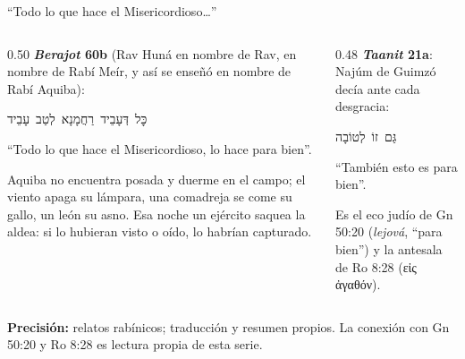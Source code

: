 \documentclass[hyperref={bookmarks=false},aspectratio=169]{beamer}
\newcommand{\heb}[1]{\mbox{\foreignlanguage{hebrew}{#1}}}
\newcommand{\grc}[1]{\foreignlanguage{ancientgreek}{#1}}
\newcommand{\precision}[1]{{\footnotesize\color{gris}\textbf{Precisión:} #1}}
\begin{document}
\begin{frame}{``Todo lo que hace el Misericordioso\ldots''}
\begin{columns}[t,onlytextwidth]
\begin{column}{0.50\textwidth}\small
\textbf{\emph{Berajot} 60b} (Rav Huná en nombre de Rav, en nombre de Rabí Meír, y así se enseñó en nombre de Rabí Aquiba):
\begin{center}\heb{כׇּל דְּעָבֵיד רַחֲמָנָא לְטַב עָבֵיד}\end{center}
``Todo lo que hace el Misericordioso, lo hace para bien''.\par\smallskip
\scriptsize Aquiba no encuentra posada y duerme en el campo; el viento apaga su lámpara, una comadreja se come su gallo, un león su asno. Esa noche un ejército saquea la aldea: si lo hubieran visto o oído, lo habrían capturado.
\end{column}
\begin{column}{0.48\textwidth}\small
\textbf{\emph{Taanit} 21a}: Najúm de Guimzó decía ante cada desgracia:
\begin{center}\heb{גַּם זוֹ לְטוֹבָה}\end{center}
``También esto es para bien''.\par\medskip
\begin{tcolorbox}[colback=papiro,colframe=azul,boxrule=1pt,arc=3pt]
\scriptsize Es el eco judío de Gn 50:20 (\emph{lejová}, ``para bien'') y la antesala de Ro 8:28 (\grc{εἰς ἀγαθόν}).
\end{tcolorbox}
\end{column}
\end{columns}\par\smallskip
\precision{relatos rabínicos; traducción y resumen propios. La conexión con Gn 50:20 y Ro 8:28 es lectura propia de esta serie.}
\end{frame}
\end{document}
